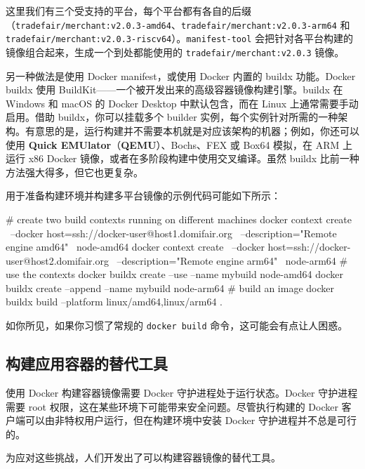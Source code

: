 这里我们有三个受支持的平台，每个平台都有各自的后缀（\texttt{tradefair/\allowbreak{}merchant:v2.\allowbreak{}0.\allowbreak{}3-amd64}、\texttt{tradefair/\allowbreak{}merchant:v2.\allowbreak{}0.\allowbreak{}3-arm64} 和 \texttt{tradefair/\allowbreak{}merchant:v2.\allowbreak{}0.\allowbreak{}3-riscv64}）。\texttt{manifest-tool} 会把针对各平台构建的镜像组合起来，生成一个到处都能使用的 \texttt{tradefair/\allowbreak{}merchant:v2.\allowbreak{}0.\allowbreak{}3} 镜像。

\label{idx:1763}
\label{idx:1764}
\label{idx:1765}
另一种做法是使用 Docker manifest，或使用 Docker 内置的 buildx 功能。Docker buildx 使用 BuildKit——一个被开发出来的高级容器镜像构建引擎。buildx 在 Windows 和 macOS 的 Docker Desktop 中默认包含，而在 Linux 上通常需要手动启用。借助 buildx，你可以挂载多个 builder 实例，每个实例针对所需的一种架构。有意思的是，运行构建并不需要本机就是对应该架构的机器；例如，你还可以使用 \textbf{Quick EMUlator}（\textbf{QEMU}）、Bochs、FEX 或 Box64 模拟，在 ARM 上运行 x86 Docker 镜像，或者在多阶段构建中使用交叉编译。虽然 buildx 比前一种方法强大得多，但它也更复杂。

用于准备构建环境并构建多平台镜像的示例代码可能如下所示：

\begin{codebox}[text]
# create two build contexts running on different machines
docker context create \
    --docker host=ssh://docker-user@host1.domifair.org \
    --description="Remote engine amd64" \
    node-amd64
docker context create \
    --docker host=ssh://docker-user@host2.domifair.org \
    --description="Remote engine arm64" \
    node-arm64
# use the contexts
docker buildx create --use --name mybuild node-amd64
docker buildx create --append --name mybuild node-arm64
# build an image
docker buildx build --platform linux/amd64,linux/arm64 .
\end{codebox}

如你所见，如果你习惯了常规的 \texttt{docker build} 命令，这可能会有点让人困惑。

\subsection{构建应用容器的替代工具}

\label{idx:1766}
使用 Docker 构建容器镜像需要 Docker 守护进程处于运行状态。Docker 守护进程需要 root 权限，这在某些环境下可能带来安全问题。尽管执行构建的 Docker 客户端可以由非特权用户运行，但在构建环境中安装 Docker 守护进程并不总是可行的。

为应对这些挑战，人们开发出了可以构建容器镜像的替代工具。

